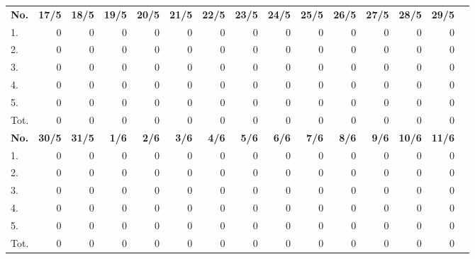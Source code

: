\documentclass{article}
\begin{document}
\begin{table}[H]
    \centering
    \begin{tabularx}{\textwidth}{| X | r | r | r | r | r | r | r | r | r | r | r | r | r | r |}
        \Xhline{2pt}
        \textbf{No.} & \textbf{17/5} & \textbf{18/5} & \textbf{19/5} & \textbf{20/5} & \textbf{21/5} & \textbf{22/5} & \textbf{23/5} & \textbf{24/5} & \textbf{25/5} & \textbf{26/5} & \textbf{27/5} & \textbf{28/5} & \textbf{29/5} \\
        \Xhline{2pt}
        1. & 0 & 0 & 0 & 0 & 0 & 0 & 0 & 0 & 0 & 0 & 0 & 0 & 0 \\
        \hline
        2. & 0 & 0 & 0 & 0 & 0 & 0 & 0 & 0 & 0 & 0 & 0 & 0 & 0 \\
        \hline
        3. & 0 & 0 & 0 & 0 & 0 & 0 & 0 & 0 & 0 & 0 & 0 & 0 & 0 \\
        \hline
        4. & 0 & 0 & 0 & 0 & 0 & 0 & 0 & 0 & 0 & 0 & 0 & 0 & 0 \\
        \hline
        5. & 0 & 0 & 0 & 0 & 0 & 0 & 0 & 0 & 0 & 0 & 0 & 0 & 0 \\
        \hline
        Tot. & 0 & 0 & 0 & 0 & 0 & 0 & 0 & 0 & 0 & 0 & 0 & 0 & 0 \\
        \Xhline{2pt}
        \textbf{No.} & \textbf{30/5} & \textbf{31/5} & \textbf{ 1/6} & \textbf{ 2/6} & \textbf{ 3/6} & \textbf{ 4/6} & \textbf{ 5/6} & \textbf{ 6/6} & \textbf{ 7/6} & \textbf{ 8/6} & \textbf{ 9/6} & \textbf{10/6} & \textbf{11/6} \\
        \Xhline{2pt}
        1. & 0 & 0 & 0 & 0 & 0 & 0 & 0 & 0 & 0 & 0 & 0 & 0 & 0 \\
        \hline
        2. & 0 & 0 & 0 & 0 & 0 & 0 & 0 & 0 & 0 & 0 & 0 & 0 & 0 \\
        \hline
        3. & 0 & 0 & 0 & 0 & 0 & 0 & 0 & 0 & 0 & 0 & 0 & 0 & 0 \\
        \hline
        4. & 0 & 0 & 0 & 0 & 0 & 0 & 0 & 0 & 0 & 0 & 0 & 0 & 0 \\
        \hline
        5. & 0 & 0 & 0 & 0 & 0 & 0 & 0 & 0 & 0 & 0 & 0 & 0 & 0 \\
        \hline
        Tot. & 0 & 0 & 0 & 0 & 0 & 0 & 0 & 0 & 0 & 0 & 0 & 0 & 0 \\
        \hline
    \end{tabularx}
\end{table}
\clearpage
\end{document}
